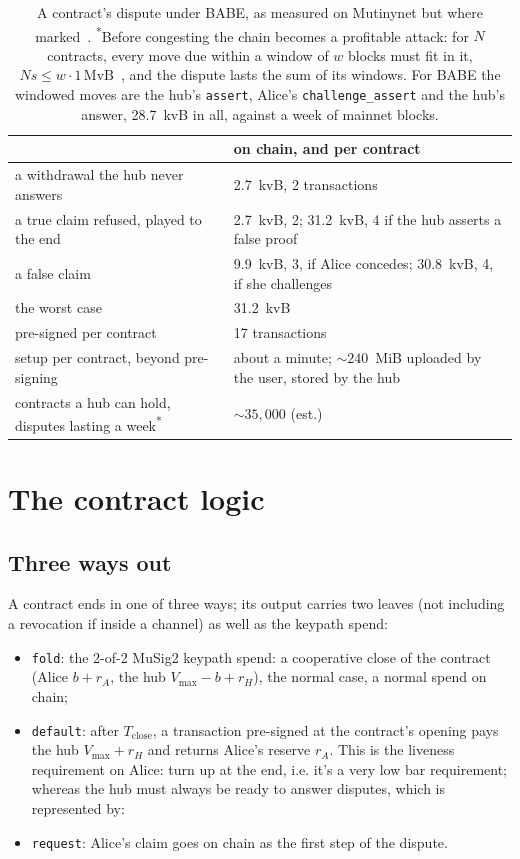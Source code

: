 \documentclass[11pt]{article}
\newcommand{\vmax}{V_{\max}}
\newcommand{\Tc}{T_{\mathrm{close}}}
\newcommand{\tx}[1]{\texttt{#1}}
\begin{document}
\begin{table}[!htp]
\centering
\small
\begin{tabularx}{\linewidth}{>{\raggedright\arraybackslash}p{58mm}L}
\toprule
& on chain, and per contract \\
\midrule
a withdrawal the hub never answers & 2.7~kvB, 2 transactions \\
a true claim refused, played to the end & 2.7~kvB, 2; 31.2~kvB, 4 if the hub asserts a false proof \\
a false claim & 9.9~kvB, 3, if Alice concedes; 30.8~kvB, 4, if she challenges \\
the worst case & 31.2~kvB \\
pre-signed per contract & 17 transactions \\
setup per contract, beyond pre-signing & about a minute; ${\sim}240$~MiB uploaded by the user, stored by the hub \\
contracts a hub can hold, disputes lasting a week\textsuperscript{*} & ${\sim}35{,}000$ (est.) \\
\bottomrule
\end{tabularx}
\caption{A contract's dispute under BABE, as measured on Mutinynet but where marked~\cite{lichenl2}.
\textsuperscript{*}Before congesting the chain becomes a profitable
attack: for $N$ contracts, every move due within a window of $w$ blocks
must fit in it, $N s \le w \cdot 1\,\mathrm{MvB}$~\cite{floodloot}, and
the dispute lasts the sum of its windows. For BABE the windowed moves are
the hub's \tx{assert}, Alice's \tx{challenge\_assert} and the hub's
answer, 28.7~kvB in all, against a week of mainnet blocks.}
\label{tab:gadgets}
\end{table}

\section{The contract logic}
\label{sec:contract}

\subsection{Three ways out}

A contract ends in one of three ways; its output carries two leaves (not including a revocation if inside a channel) as well as the keypath spend:
\begin{itemize}[leftmargin=1.5em]
\item \tx{fold}: the 2-of-2 MuSig2 keypath spend: a cooperative close of the contract (Alice
  $b + r_A$, the hub $\vmax - b + r_H$), the normal case, a normal spend on chain;
\item \tx{default}: after $\Tc$, a transaction pre-signed at the
  contract's opening pays the hub $\vmax + r_H$ and returns Alice's
  reserve $r_A$. This is the liveness requirement on Alice: turn up at the end, i.e. it's a very low bar requirement; whereas the hub must always be ready to answer disputes, which is represented by:
\item \tx{request}: Alice's claim goes on chain
  as the first step of the dispute.
\end{itemize}
\end{document}
